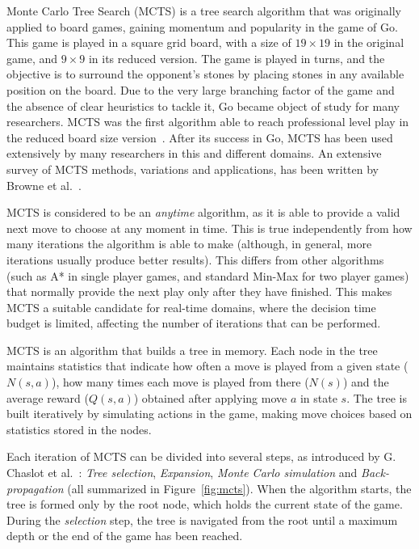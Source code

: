 \documentclass[journal]{IEEEtran}
\begin{document}
Monte Carlo Tree Search (MCTS) is a tree search algorithm that was originally applied to board games, gaining momentum and popularity in the game of Go. This game is played in a square grid board, with a size of $19 \times 19$ in the original game, and $9 \times 9$ in its reduced version. The game is played in turns, and the objective is to surround the opponent's stones by placing stones in any available position on the board. Due to the very large branching factor of the game and the absence of clear heuristics to tackle it, Go became object of study for many researchers. MCTS was the first algorithm able to reach professional level play in the reduced board size version~\cite{Lee2009}. After its success in Go, MCTS has been used extensively by many researchers in this and different domains. An extensive survey of MCTS methods, variations and applications, has been written by Browne et al.~\cite{Browne2012}. 

MCTS is considered to be an \textit{anytime} algorithm, as it is able to provide a valid next move to choose at any moment in time. This is true independently from how many iterations the algorithm is able to make (although, in general, more iterations usually produce better results). This differs from other algorithms (such as A* in single player games, and standard Min-Max for two player games) that normally provide the next play only after they have finished. This makes MCTS a suitable candidate for real-time domains, where the decision time budget is limited, affecting the number of iterations that can be performed.

MCTS is an algorithm that builds a tree in memory. Each node in the tree maintains statistics that indicate how often a move is played from a given state ($N(s,a)$), how many times each move is played from there ($N(s)$) and the average reward ($Q(s,a)$) obtained after applying move $a$ in state $s$. The tree is built iteratively by simulating actions in the game, making move choices based on statistics stored in the nodes. 

Each iteration of MCTS can be divided into several steps, as introduced by G. Chaslot et al.~\cite{Chaslot2007}: \textit{Tree selection}, \textit{Expansion}, \textit{Monte Carlo simulation} and \textit{Back-propagation} (all summarized in Figure~\ref{fig:mcts}). When the algorithm starts, the tree is formed only by the root node, which holds the current state of the game. During the \textit{selection} step, the tree is navigated from the root until a maximum depth or the end of the game has been reached. 
\end{document}
